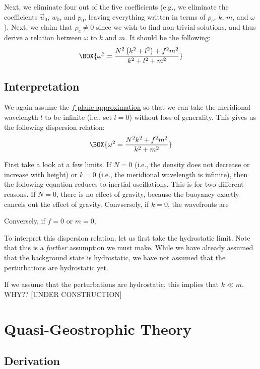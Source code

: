 \vspace{2mm} Next, we eliminate four out of the five coefficients (e.g., we eliminate the coefficients $\vec{u}_0$, $w_0$, and $p_0$, leaving everything written in terms of $\rho_c$, $k$, $m$, and $\omega$). Next, we claim that $\rho_c\neq 0$ since we wish to find non-trivial solutions, and thus derive a relation between $\omega$ to $k$ and $m$. It should be the following:
\begin{gather}
    \BOX{\omega^2 = \frac{N^2 \left( k^2 + l^2 \right) + f^2 m^2}{k^2 + l^2 + m^2}}
\end{gather}

\subsection{Interpretation}

We again assume the \hyperref[f plane box]{$f$-plane approximation} so that we can take the meridional wavelength $l$ to be infinite (i.e., set $l=0$) without loss of generality. This gives us the following dispersion relation:
\begin{align}
    \BOX{\omega^2 = \frac{N^2  k^2   + f^2 m^2}{k^2 + m^2}}
\end{align}

First take a look at a few limits. If $N=0$ (i.e., the density does not decrease or increase with height) or $k=0$ (i.e., the meridional wavelength is infinite), then the following equation reduces to inertial oscillations. This is for two different reasons. If $N=0$, there is no effect of gravity, because the buoyancy exactly cancels out the effect of gravity. Convsersely, if $k=0$, the wavefronts are 

Conversely, if $f=0$ or $m=0$, 

To interpret this dispersion relation, let us first take the hydrostatic limit. Note that this is a \textit{further} assumption we must make. While we have already assumed that the background state is hydrostatic, we have not assumed that the perturbations are hydrostatic yet. 

If we assume that the perturbations are hydrostatic, this implies that $k\ll m$. WHY?? [UNDER CONSTRUCTION]

\section{Quasi-Geostrophic Theory}\label{QG}

\subsection{Derivation}

